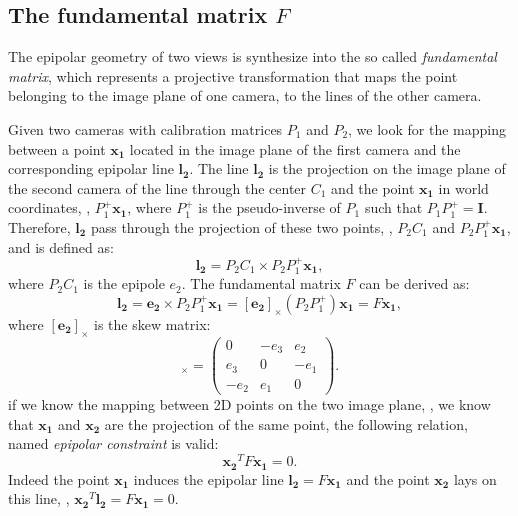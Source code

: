 \subsection{The fundamental matrix \texorpdfstring{$F$}{F}}
The epipolar geometry of two views is synthesize into the so called \emph{fundamental matrix}, which represents a projective transformation that maps the point belonging to the image plane of one camera, to the lines of the other camera.

Given two cameras with calibration matrices $P_1$ and $P_2$, we look for the mapping between a point $\mathbf{x_1}$ located in the image plane of the first camera and the corresponding epipolar line $\mathbf{l_2}$. 
The line $\mathbf{l_2}$ is the projection on the image plane of the second camera of the line through the center $C_1$ and the point $\mathbf{x_1}$ in world coordinates, \ie, $P_1^+\mathbf{x_1}$, where $P_1^+$ is the pseudo-inverse of $P_1$ such that $P_1P_1^+ = \mathbf{I}$.
Therefore, $\mathbf{l_2}$ pass through the projection of these two points, \ie, $P_2C_1$ and $P_2P_1^+\mathbf{x_1}$, and is defined as:
\begin{equation}
 \mathbf{l_2} =  P_2C_1 \times P_2P_1^+\mathbf{x_1},
\end{equation}
where $P_2C_1$ is the epipole $e_2$. The fundamental matrix $F$ can be derived as:
\begin{equation}
 \mathbf{l_2} =  \mathbf{e_2} \times P_2P_1^+\mathbf{x_1} = [\mathbf{e_2}]_{\times} (P_2P_1^+)\mathbf{x_1} = F \mathbf{x_1},
\end{equation}
where $[\mathbf{e_2}]_{\times}$ is the skew matrix:
\begin{equation}
  [e]_{\times} =
  \begin{pmatrix}
    0   & -e_3 & e_2\\
    e_3 &   0  & -e_1\\
   -e_2 &  e_1 & 0
  \end{pmatrix}.
\end{equation}
if we know the mapping between 2D points on the two image plane, \eg, we know that $\mathbf{x_1}$ and $\mathbf{x_2}$ are the projection of the same point, the following relation, named \emph{epipolar constraint} is valid:
\begin{equation}
  \mathbf{x_2}^{T} F \mathbf{x_1} = 0.
\end{equation}
Indeed the point  $\mathbf{x_1}$ induces the epipolar line $\mathbf{l_2} = F \mathbf{x_1}$ and the point $\mathbf{x_2}$ lays on this line, \ie, $\mathbf{x_2}^{T} \mathbf{l_2} =  F \mathbf{x_1} = 0$.

